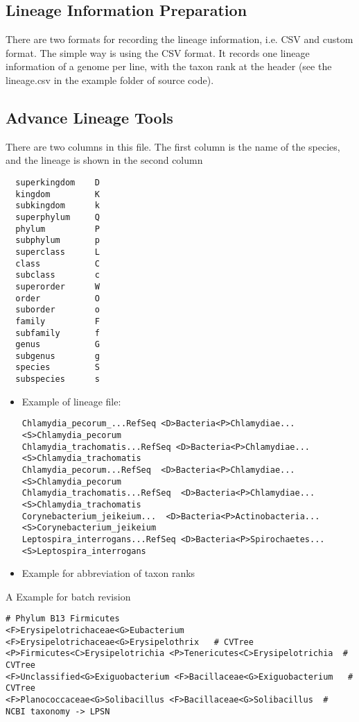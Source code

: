 \documentclass[12pt,a4paper]{article}
\begin{document}
\subsection{Lineage Information Preparation}

There are two formats for recording the lineage information, i.e. CSV and custom format. The simple way is using the CSV format. It records one lineage information of a genome per line, with the taxon rank at the header (see the lineage.csv in the example folder of source code). 

\subsection{Advance Lineage Tools}
There are two columns in this file. The first column is the name of the species, and the lineage is shown in the second column

\begin{verbatim}
  superkingdom    D
  kingdom         K
  subkingdom      k
  superphylum     Q
  phylum          P
  subphylum       p
  superclass      L
  class           C
  subclass        c
  superorder      W
  order           O
  suborder        o
  family          F
  subfamily       f
  genus           G
  subgenus        g
  species         S
  subspecies      s
  \end{verbatim}
  

\begin{itemize}
	\item Example of lineage file:
{\footnotesize
\begin{verbatim}
Chlamydia_pecorum_...RefSeq <D>Bacteria<P>Chlamydiae...<S>Chlamydia_pecorum
Chlamydia_trachomatis...RefSeq <D>Bacteria<P>Chlamydiae...<S>Chlamydia_trachomatis
Chlamydia_pecorum...RefSeq  <D>Bacteria<P>Chlamydiae...<S>Chlamydia_pecorum
Chlamydia_trachomatis...RefSeq  <D>Bacteria<P>Chlamydiae...<S>Chlamydia_trachomatis
Corynebacterium_jeikeium...  <D>Bacteria<P>Actinobacteria...<S>Corynebacterium_jeikeium
Leptospira_interrogans...RefSeq <D>Bacteria<P>Spirochaetes...<S>Leptospira_interrogans
\end{verbatim}
}
\item Example for abbreviation of taxon ranks
\end{itemize}
A Example for batch revision
{\footnotesize
\begin{verbatim}
# Phylum B13 Firmicutes
<F>Erysipelotrichaceae<G>Eubacterium <F>Erysipelotrichaceae<G>Erysipelothrix   # CVTree
<P>Firmicutes<C>Erysipelotrichia <P>Tenericutes<C>Erysipelotrichia  # CVTree
<F>Unclassified<G>Exiguobacterium <F>Bacillaceae<G>Exiguobacterium   # CVTree
<F>Planococcaceae<G>Solibacillus <F>Bacillaceae<G>Solibacillus  #   NCBI taxonomy -> LPSN
\end{verbatim}
}
\end{document}
